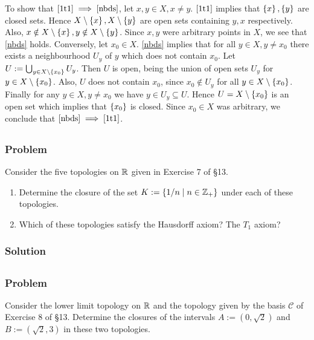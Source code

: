 To show that $\ref{1t1} \implies \ref{nbds}$, let $x,y \in X, x \neq y$. $\ref{1t1}$ implies that $\left\{ x \right\}, \left\{ y \right\}$ are closed sets. Hence $X\setminus\left\{ x \right\}, X\setminus\left\{ y \right\}$ are open sets containing $y, x$ respectively. Also, $x \notin X\setminus\left\{ x \right\}, y \notin X\setminus\left\{ y \right\}$. Since $x, y$ were arbitrary points in $X$, we see that \ref{nbds} holds. Conversely, let $x_0 \in X$. \ref{nbds} implies that for all $y \in X, y \neq x_0$ there exists a neighbourhood $U_y$ of $y$ which does not contain $x_0$. Let $U := \bigcup_{y \in X\setminus\left\{ x_0 \right\}}U_y$. Then $U$ is open, being the union of open sets $U_y$ for $y \in X\setminus\left\{ x_0 \right\}$. Also, $U$ does not contain $x_0$, since $x_0 \notin U_y$ for all $y \in X\setminus\left\{ x_0 \right\}$. Finally for any $y \in X, y \neq x_0$ we have $y \in U_y \subseteq U$. Hence $U = X\setminus\left\{ x_0 \right\}$ is an open set which implies that $\left\{ x_0 \right\}$ is closed. Since $x_0 \in X$ was arbitrary, we conclude that $\ref{nbds} \implies \ref{1t1}$. 


\subsection{}

\subsubsection{Problem}
Consider the five topologies on $\mathbb R$ given in Exercise 7 of \S 13.
\begin{enumerate}
    \item Determine the closure of the set $K := \{ 1/n \mid n \in \mathbb Z_+ \}$ under each of these topologies.
    \item Which of these topologies satisfy the Hausdorff axiom? The $T_1$ axiom?
\end{enumerate}

\subsubsection{Solution}
\todo


\subsection{}

\subsubsection{Problem}
Consider the lower limit topology on $\mathbb R$ and the topology given by the basis $\mathcal{C}$ of Exercise 8 of \S 13. Determine the closures of the intervals $A := (0, \sqrt{2})$ and $B := (\sqrt{2}, 3)$ in these two topologies.

